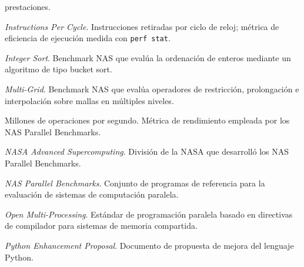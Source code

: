 \begin{description}
        prestaciones.
  \item[IPC] \emph{Instructions Per Cycle}. Instrucciones retiradas por ciclo
        de reloj; métrica de eficiencia de ejecución medida con
        \texttt{perf stat}.
  \item[IS] \emph{Integer Sort}. Benchmark NAS que evalúa la ordenación de
        enteros mediante un algoritmo de tipo bucket sort.
  \item[MG] \emph{Multi-Grid}. Benchmark NAS que evalúa operadores de
        restricción, prolongación e interpolación sobre mallas en múltiples
        niveles.
  \item[Mop/s] Millones de operaciones por segundo. Métrica de rendimiento
        empleada por los NAS Parallel Benchmarks.
  \item[NAS] \emph{NASA Advanced Supercomputing}. División de la NASA que
        desarrolló los NAS Parallel Benchmarks.
  \item[NPB] \emph{NAS Parallel Benchmarks}. Conjunto de programas de
        referencia para la evaluación de sistemas de computación paralela.
  \item[OpenMP] \emph{Open Multi-Processing}. Estándar de programación
        paralela basado en directivas de compilador para sistemas de memoria
        compartida.
  \item[PEP] \emph{Python Enhancement Proposal}. Documento de propuesta de
        mejora del lenguaje Python.
\end{description}

